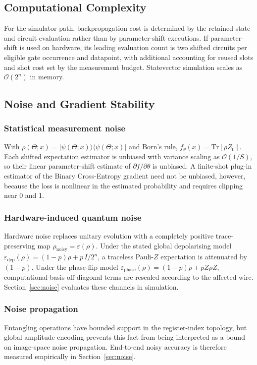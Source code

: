 \documentclass[conference]{IEEEtran}
\begin{document}
\subsection{Computational Complexity}
For the simulator path, backpropagation cost is determined by the retained state and circuit evaluation rather than by parameter-shift executions. If parameter-shift is used on hardware, its leading evaluation count is two shifted circuits per eligible gate occurrence and datapoint, with additional accounting for reused slots and shot cost set by the measurement budget. Statevector simulation scales as $\mathcal{O}(2^n)$ in memory. 

\subsection{Noise and Gradient Stability}
\subsubsection{Statistical measurement noise}
With $\rho(\Theta; x) = |\psi(\Theta; x)\rangle\langle\psi(\Theta; x)|$ and Born's rule, $f_\theta(x) = \text{Tr}[\rho Z_0]$. Each shifted expectation estimator is unbiased with variance scaling as $\mathcal{O}(1/S)$, so their linear parameter-shift estimate of $\partial f/\partial\theta$ is unbiased. A finite-shot plug-in estimator of the Binary Cross-Entropy gradient need not be unbiased, however, because the loss is nonlinear in the estimated probability and requires clipping near 0 and 1.

\subsubsection{Hardware-induced quantum noise}
Hardware noise replaces unitary evolution with a completely positive trace-preserving map $\rho_{\text{noisy}} = \varepsilon(\rho)$. Under the stated global depolarising model $\varepsilon_{\text{dep}}(\rho) = (1 - p)\rho + p\, I/2^n$, a traceless Pauli-$Z$ expectation is attenuated by $(1-p)$. Under the phase-flip model $\varepsilon_{\text{phase}}(\rho) = (1 - p)\rho + p Z\rho Z$, computational-basis off-diagonal terms are rescaled according to the affected wire. Section~\ref{sec:noise} evaluates these channels in simulation.

\subsubsection{Noise propagation}
Entangling operations have bounded support in the register-index topology, but global amplitude encoding prevents this fact from being interpreted as a bound on image-space noise propagation. End-to-end noisy accuracy is therefore measured empirically in Section~\ref{sec:noise}.
\end{document}
